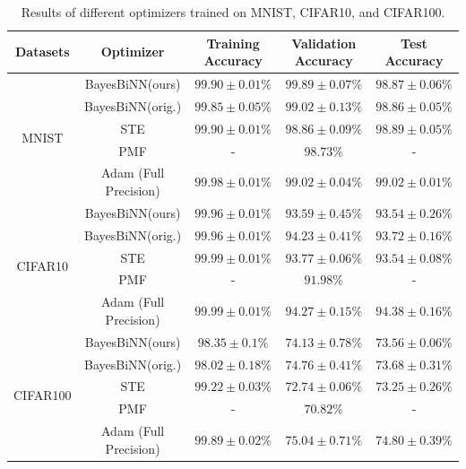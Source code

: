 \begin{table}[h]
\begin{center}
\small
\begin{tabular}{ | c | c | c | c | c | }
\hline
 Datasets & Optimizer & Training Accuracy & Validation Accuracy & Test Accuracy \\ \hline
  \multirow{5}{4em}{MNIST} 
   & BayesBiNN(ours) & $99.90 \pm 0.01\%$ & $99.89 \pm 0.07\%$ & $98.87 \pm 0.06\%$  \\
   & BayesBiNN(orig.) & $99.85 \pm 0.05\%$ & $99.02 \pm 0.13\%$ & $98.86 \pm 0.05\%$  \\
   & STE & $99.90 \pm 0.01\%$ & $98.86 \pm 0.09\%$ & $98.89 \pm 0.05\%$  \\
   & PMF & - & $98.73\%$ & -  \\
   & Adam (Full Precision) & $99.98 \pm 0.01\%$ & $99.02 \pm 0.04\%$ & $99.02 \pm 0.01\%$  \\ 
\hline

  \multirow{5}{4em}{CIFAR10}
   & BayesBiNN(ours) & $99.96 \pm 0.01\%$ & $93.59 \pm 0.45\%$ & $93.54 \pm 0.26\%$  \\
   & BayesBiNN(orig.) & $99.96 \pm 0.01\%$ & $94.23 \pm 0.41\%$ & $93.72 \pm 0.16\%$  \\
   & STE & $99.99 \pm 0.01\%$ & $93.77 \pm 0.06\%$ & $93.54 \pm 0.08\%$  \\
   & PMF & - & $91.98\%$ & -  \\
   & Adam (Full Precision) & $99.99 \pm 0.01\%$ & $94.27 \pm 0.15\%$ & $94.38 \pm 0.16\%$  \\ 
\hline
   
   
  \multirow{5}{4em}{CIFAR100} 
   & BayesBiNN(ours) & $98.35 \pm 0.1\%$ & $74.13 \pm 0.78\%$ & $73.56 \pm 0.06 \%$ \\
   & BayesBiNN(orig.) & $98.02 \pm 0.18\%$ & $74.76 \pm 0.41\%$ & $73.68 \pm 0.31\%$  \\
   & STE & $99.22 \pm 0.03\%$ & $72.74 \pm 0.06\%$ & $73.25 \pm 0.26\%$  \\
   & PMF & - & $70.82\%$ & -  \\
   & Adam (Full Precision) & $99.89 \pm 0.02\%$ & $75.04 \pm 0.71\%$ & $74.80 \pm 0.39\%$  \\ \hline
\end{tabular}
\caption{Results of different optimizers trained on MNIST, CIFAR10, and CIFAR100.}
\label{tab:result_1}

\end{center}
\end{table}

